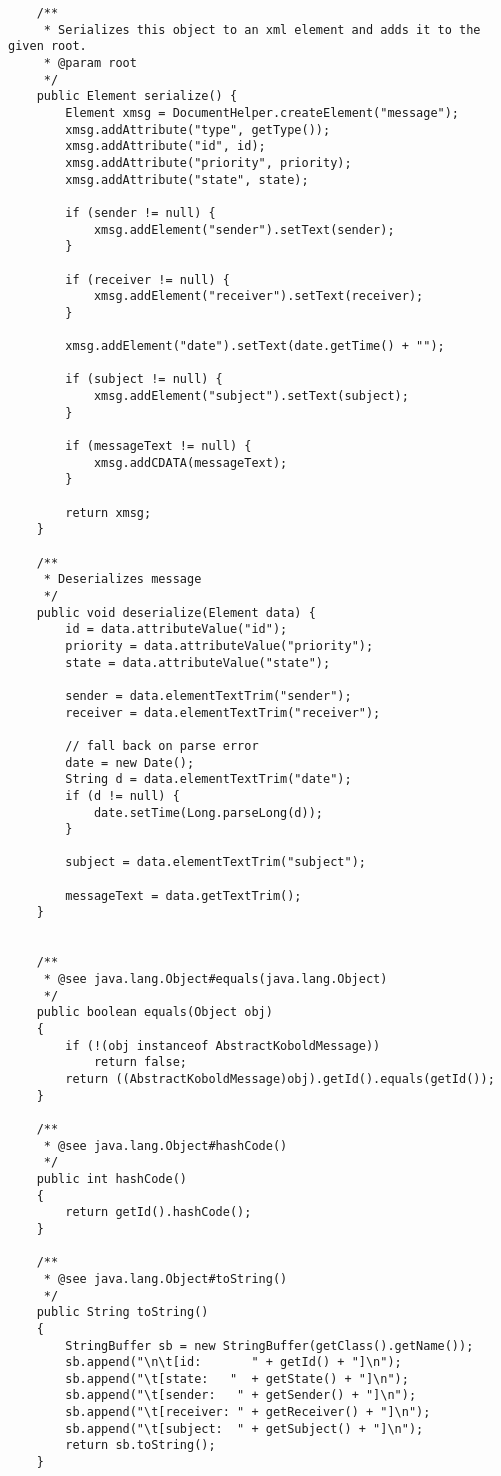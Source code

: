 \begin{verbatim}
	/**
	 * Serializes this object to an xml element and adds it to the given root.
	 * @param root
	 */
	public Element serialize() {
		Element xmsg = DocumentHelper.createElement("message");
		xmsg.addAttribute("type", getType());
		xmsg.addAttribute("id", id);
		xmsg.addAttribute("priority", priority);
		xmsg.addAttribute("state", state);
		
		if (sender != null) {
		    xmsg.addElement("sender").setText(sender);
		}
		
		if (receiver != null) {
		    xmsg.addElement("receiver").setText(receiver);
		}

		xmsg.addElement("date").setText(date.getTime() + "");

		if (subject != null) {
		    xmsg.addElement("subject").setText(subject);
        } 
		
		if (messageText != null) {
		    xmsg.addCDATA(messageText);
		}	
		
		return xmsg;
	}

	/**
	 * Deserializes message 
	 */
	public void deserialize(Element data) {
		id = data.attributeValue("id");
		priority = data.attributeValue("priority");
		state = data.attributeValue("state");
				
		sender = data.elementTextTrim("sender");
		receiver = data.elementTextTrim("receiver");
		
		// fall back on parse error
		date = new Date();
		String d = data.elementTextTrim("date");
		if (d != null) {
			date.setTime(Long.parseLong(d));
		}

		subject = data.elementTextTrim("subject");

		messageText = data.getTextTrim();
	}


	/**
	 * @see java.lang.Object#equals(java.lang.Object)
	 */
	public boolean equals(Object obj) 
	{
		if (!(obj instanceof AbstractKoboldMessage)) 
			return false;
		return ((AbstractKoboldMessage)obj).getId().equals(getId());
	}

	/**
	 * @see java.lang.Object#hashCode()
	 */
	public int hashCode() 
	{
		return getId().hashCode();
	}

	/**
	 * @see java.lang.Object#toString()
	 */
	public String toString() 
	{
		StringBuffer sb = new StringBuffer(getClass().getName());
		sb.append("\n\t[id:       " + getId() + "]\n");
		sb.append("\t[state:   "  + getState() + "]\n");
		sb.append("\t[sender:   " + getSender() + "]\n");
		sb.append("\t[receiver: " + getReceiver() + "]\n");
		sb.append("\t[subject:  " + getSubject() + "]\n");
		return sb.toString();
	}


\end{verbatim}
